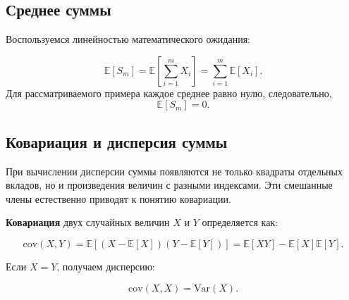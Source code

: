 \documentclass[
  russian,
  12pt,
  a4paper,
  a4paper,
  openany]{scrbook}
\begin{document}
\subsection{Среднее
суммы}\label{ux441ux440ux435ux434ux43dux435ux435-ux441ux443ux43cux43cux44b}

Воспользуемся линейностью математического ожидания:

\[\mathbb{E}[S_m]=\mathbb{E}\!\left[\sum_{i=1}^{m}X_i\right]=\sum_{i=1}^{m}\mathbb{E}[X_i].\]
Для рассматриваемого примера каждое среднее равно нулю, следовательно,
\[\boxed{\mathbb{E}[S_m]=0.}\]

\subsection{Ковариация и дисперсия
суммы}\label{ux43aux43eux432ux430ux440ux438ux430ux446ux438ux44f-ux438-ux434ux438ux441ux43fux435ux440ux441ux438ux44f-ux441ux443ux43cux43cux44b}

При вычислении дисперсии суммы появляются не только квадраты отдельных
вкладов, но и произведения величин с разными индексами. Эти смешанные
члены естественно приводят к понятию ковариации.

\begin{booknote}

\textbf{Ковариация} двух случайных величин \(X\) и \(Y\) определяется
как:

\[\boxed{
\mathrm{cov}(X,Y)
=\mathbb{E}\!\left[(X-\mathbb{E}[X])(Y-\mathbb{E}[Y])\right]
=\mathbb{E}[XY]-\mathbb{E}[X]\mathbb{E}[Y].
}\]

Если \(X=Y\), получаем дисперсию:

\[\mathrm{cov}(X,X)=\mathrm{Var}(X).\]

\end{booknote}
\end{document}

